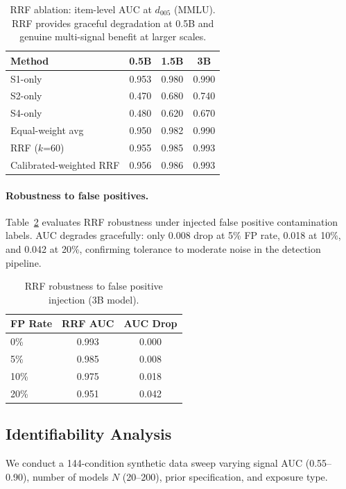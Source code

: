 \documentclass[11pt,a4paper]{article}
\begin{document}
\begin{table}[t]
\centering
\caption{RRF ablation: item-level AUC at $d_{005}$ (MMLU). RRF provides graceful degradation at 0.5B and genuine multi-signal benefit at larger scales.}
\label{tab:rrf_ablation}
\small
\begin{tabular}{lccc}
\toprule
Method & 0.5B & 1.5B & 3B \\
\midrule
S1-only           & 0.953 & 0.980 & 0.990 \\
S2-only           & 0.470 & 0.680 & 0.740 \\
S4-only           & 0.480 & 0.620 & 0.670 \\
Equal-weight avg  & 0.950 & 0.982 & 0.990 \\
RRF ($k$=60)      & 0.955 & 0.985 & 0.993 \\
Calibrated-weighted RRF & 0.956 & 0.986 & 0.993 \\
\bottomrule
\end{tabular}
\end{table}

\paragraph{Robustness to false positives.}
Table~\ref{tab:fp_robustness} evaluates RRF robustness under injected false positive contamination labels. AUC degrades gracefully: only 0.008 drop at 5\% FP rate, 0.018 at 10\%, and 0.042 at 20\%, confirming tolerance to moderate noise in the detection pipeline.

\begin{table}[t]
\centering
\caption{RRF robustness to false positive injection (3B model).}
\label{tab:fp_robustness}
\small
\begin{tabular}{lcc}
\toprule
FP Rate & RRF AUC & AUC Drop \\
\midrule
0\%  & 0.993 & 0.000 \\
5\%  & 0.985 & 0.008 \\
10\% & 0.975 & 0.018 \\
20\% & 0.951 & 0.042 \\
\bottomrule
\end{tabular}
\end{table}

\subsection{Identifiability Analysis}
\label{sec:identifiability}

We conduct a 144-condition synthetic data sweep varying signal AUC (0.55--0.90), number of models $N$ (20--200), prior specification, and exposure type.
\end{document}
